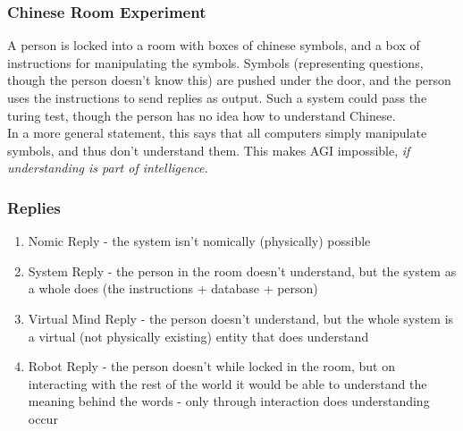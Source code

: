 \subsubsection{Chinese Room Experiment}
A person is locked into a room with boxes of chinese symbols, and a box of instructions for manipulating the symbols. Symbols (representing questions, though the person doesn't know this) are pushed under the door, and the person uses the instructions to send replies as output. Such a system could pass the turing test, though the person has no idea how to understand Chinese.\\

In a more general statement, this says that all computers simply manipulate symbols, and thus don't understand them. This makes AGI impossible, \emph{if understanding is part of intelligence.}

\subsubsection{Replies}
\begin{enumerate}
    \item Nomic Reply - the system isn't nomically (physically) possible
    \item System Reply - the person in the room doesn't understand, but the system as a whole does (the instructions + database + person)
    \item Virtual Mind Reply - the person doesn't understand, but the whole system is a virtual (not physically existing) entity that does understand
    \item Robot Reply - the person doesn't while locked in the room, but on interacting with the rest of the world it would be able to understand the meaning behind the words - only through interaction does understanding occur
\end{enumerate}